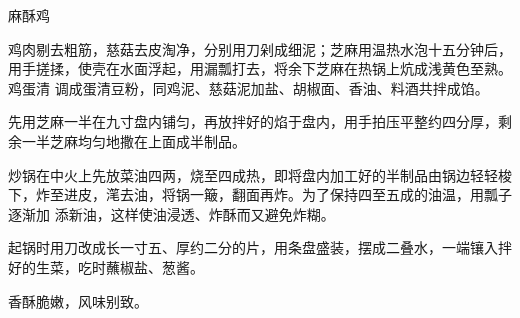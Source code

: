 %
%
%
%
%
%
%
\begin{recipe}{麻酥鸡}

\ingredients


\preparation

\step 鸡肉剔去粗筋，慈菇去皮淘净，分别用刀剁成细泥；芝麻用温热水泡十五分钟后，
用手搓揉，使壳在水面浮起，用漏瓢打去，将余下芝麻在热锅上炕成浅黄色至熟。鸡蛋清
调成蛋清豆粉，同鸡泥、慈菇泥加盐、胡椒面、香油、料酒共拌成馅。

\step 先用芝麻一半在九寸盘内铺匀，再放拌好的焰于盘内，用手拍压平整约四分厚，剩
余一半芝麻均匀地撒在上面成半制品。

\step 炒锅在中火上先放菜油四两，烧至四成热，即将盘内加工好的半制品由锅边轻轻梭
下，炸至进皮，滗去油，将锅一簸，翻面再炸。为了保持四至五成的油温，用瓢子逐渐加
添新油，这样使油浸透、炸酥而又避免炸糊。

\step 起锅时用刀改成长一寸五、厚约二分的片，用条盘盛装，摆成二叠水，一端镶入拌
好的生菜，吃时蘸椒盐、葱酱。

\features

香酥脆嫩，风味别致。

\end{recipe}

